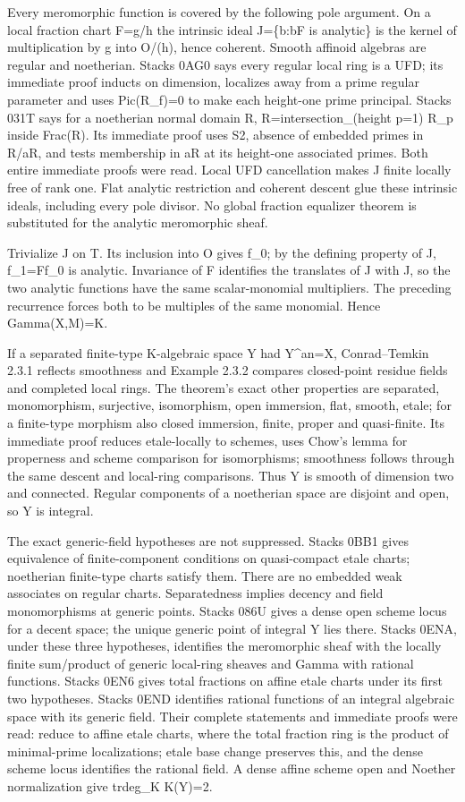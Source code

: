 \documentclass[11pt]{article}
\begin{document}
Every meromorphic function is covered by the following pole argument. On a local fraction chart F=g/h the intrinsic ideal J=\{b:bF is analytic\} is the kernel of multiplication by g into O/(h), hence coherent. Smooth affinoid algebras are regular and noetherian. Stacks 0AG0 says every regular local ring is a UFD; its immediate proof inducts on dimension, localizes away from a prime regular parameter and uses Pic(R\_f)=0 to make each height-one prime principal. Stacks 031T says for a noetherian normal domain R, R=intersection\_(height p=1) R\_p inside Frac(R). Its immediate proof uses S2, absence of embedded primes in R/aR, and tests membership in aR at its height-one associated primes. Both entire immediate proofs were read. Local UFD cancellation makes J finite locally free of rank one. Flat analytic restriction and coherent descent glue these intrinsic ideals, including every pole divisor. No global fraction equalizer theorem is substituted for the analytic meromorphic sheaf.

Trivialize J on T. Its inclusion into O gives f\_0; by the defining property of J, f\_1=Ff\_0 is analytic. Invariance of F identifies the translates of J with J, so the two analytic functions have the same scalar-monomial multipliers. The preceding recurrence forces both to be multiples of the same monomial. Hence Gamma(X,M)=K.

If a separated finite-type K-algebraic space Y had Y\textasciicircum{}an=X, Conrad--Temkin 2.3.1 reflects smoothness and Example 2.3.2 compares closed-point residue fields and completed local rings. The theorem's exact other properties are separated, monomorphism, surjective, isomorphism, open immersion, flat, smooth, etale; for a finite-type morphism also closed immersion, finite, proper and quasi-finite. Its immediate proof reduces etale-locally to schemes, uses Chow's lemma for properness and scheme comparison for isomorphisms; smoothness follows through the same descent and local-ring comparisons. Thus Y is smooth of dimension two and connected. Regular components of a noetherian space are disjoint and open, so Y is integral.

The exact generic-field hypotheses are not suppressed. Stacks 0BB1 gives equivalence of finite-component conditions on quasi-compact etale charts; noetherian finite-type charts satisfy them. There are no embedded weak associates on regular charts. Separatedness implies decency and field monomorphisms at generic points. Stacks 086U gives a dense open scheme locus for a decent space; the unique generic point of integral Y lies there. Stacks 0ENA, under these three hypotheses, identifies the meromorphic sheaf with the locally finite sum/product of generic local-ring sheaves and Gamma with rational functions. Stacks 0EN6 gives total fractions on affine etale charts under its first two hypotheses. Stacks 0END identifies rational functions of an integral algebraic space with its generic field. Their complete statements and immediate proofs were read: reduce to affine etale charts, where the total fraction ring is the product of minimal-prime localizations; etale base change preserves this, and the dense scheme locus identifies the rational field. A dense affine scheme open and Noether normalization give trdeg\_K K(Y)=2.
\end{document}
